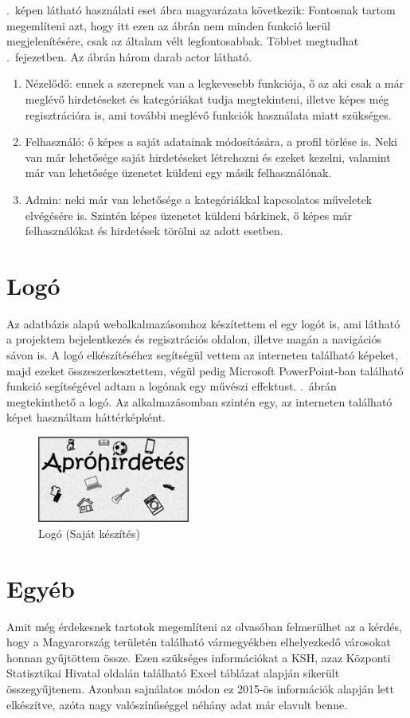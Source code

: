 \documentclass[]{thesis-ekf}
\theoremstyle{definition}
\theoremstyle{remark}
\begin{document}
	.~képen látható használati eset ábra magyarázata következik:
	Fontosnak tartom megemlíteni azt, hogy itt ezen az ábrán nem minden funkció kerül megjelenítésére, csak az általam vélt  legfontosabbak. Többet megtudhat .~fejezetben. Az ábrán három darab actor látható.
	\begin{enumerate}
		\item Nézelődő: ennek a szerepnek van a legkevesebb funkciója, ő az aki csak a már meglévő hirdetéseket és kategóriákat tudja megtekinteni, illetve képes még regisztrációra is, ami további meglévő funkciók használata miatt szükséges.
		\item Felhasználó: ő képes a saját adatainak módosítására, a profil törlése is. Neki van már lehetősége saját hirdetéseket létrehozni és ezeket kezelni, valamint már van lehetősége üzenetet küldeni egy másik felhasználónak.
		\item Admin: neki már van lehetősége a kategóriákkal kapcsolatos műveletek elvégésére is. Szintén képes üzenetet küldeni bárkinek, ő képes már felhasználókat és hirdetések törölni az adott esetben.
	\end{enumerate}
	\section{Logó}
		Az adatbázis alapú webalkalmazásomhoz készítettem el egy logót is, ami látható a projektem bejelentkezés és regisztrációs oldalon, illetve magán a navigációs sávon is. A logó elkészítéséhez segítségül vettem az interneten található képeket, majd ezeket összeszerkesztettem, végül pedig Microsoft PowerPoint-ban található funkció segítségével adtam a logónak egy művészi effektust. .~ábrán megtekinthető a logó. Az alkalmazásomban szintén egy, az interneten található képet használtam háttérképként. \cite{Logo, Hatterkep}
		\begin{figure}[ht!]
			\centering
			\includegraphics[width=5cm]{./tervezes/logo}
			\caption{Logó (Saját készítés)} 
			\label{logo}
		\end{figure}
	
	\section{Egyéb}
		Amit még érdekesnek tartotok megemlíteni az olvasóban felmerülhet az a kérdés, hogy a Magyarország területén található vármegyékben elhelyezkedő városokat honnan gyűjtöttem össze. Ezen szükséges információkat a KSH, azaz Központi Statisztikai Hivatal oldalán található Excel táblázat alapján sikerült összegyűjtenem. Azonban sajnálatos módon ez 2015-ös információk alapján lett elkészítve, azóta nagy valószínűséggel néhány adat már elavult benne. \cite{KSH}
\end{document}
